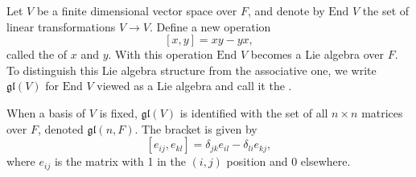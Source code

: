 Let $V$ be a finite dimensional vector space over $F$, and denote by $\text{End } V$ the set of linear transformations $V \rightarrow V$. Define a new operation
$$[x, y] = xy - yx,$$
called the  of $x$ and $y$. With this operation $\text{End } V$ becomes a Lie algebra over $F$. To distinguish this Lie algebra structure from the associative one, we write $\mathfrak{gl}(V)$ for $\text{End } V$ viewed as a Lie algebra and call it the .

When a basis of $V$ is fixed, $\mathfrak{gl}(V)$ is identified with the set of all $n \times n$ matrices over $F$, denoted $\mathfrak{gl}(n, F)$. The bracket is given by
$$[e_{ij}, e_{kl}] = \delta_{jk}e_{il} - \delta_{li}e_{kj},$$
where $e_{ij}$ is the matrix with 1 in the $(i,j)$ position and 0 elsewhere.
